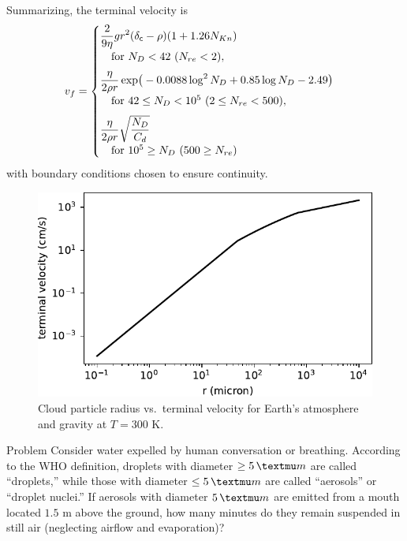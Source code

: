 Summarizing, the terminal velocity is
\begin{align}
\label{eq:vterm}
v_f =
\begin{cases}
\displaystyle{\frac{2}{9 \eta} g r^2 (\delta_{\mathsf{c}}- \rho) (1+1.26 N_{Kn}) } \\
\quad \mbox{for $N_D < 42$ ($N_{re} < 2$)}, \\[6pt]
\displaystyle{ \frac{\eta}{2 \rho r} \exp\!\big(-0.0088 \log^2{N_D}+0.85 \log{N_D} -2.49\big)} \\
\quad \mbox{for $42 \le N_D < 10^5$ ($2 \le N_{re} < 500$)}, \\[6pt]
\displaystyle{\frac{\eta}{2 \rho r} \sqrt{\frac{N_D}{C_d}}} \\
\quad \mbox{for $10^5 \ge N_D$ ($500 \ge N_{re}$)} 
\end{cases}
\end{align}
with boundary conditions chosen to ensure continuity.

\begin{figure}[htb]
\begin{center}
\includegraphics[width=\linewidth]{fig/clouds/vterm.pdf}
\caption{Cloud particle radius vs.\ terminal velocity for Earth’s atmosphere and gravity at $T=300$ K.\label{fig:vterm}}
\end{center}
\end{figure}

\begin{itembox}{Problem}
Consider water expelled by human conversation or breathing.  
According to the WHO definition, droplets with diameter $\geq 5\,\textmu m$ are called ``droplets,'' while those with diameter $\leq 5\,\textmu m$ are called ``aerosols'' or ``droplet nuclei.''  
If aerosols with diameter $5\,\textmu m$ are emitted from a mouth located $1.5$ m above the ground, how many minutes do they remain suspended in still air (neglecting airflow and evaporation)?
\end{itembox}


